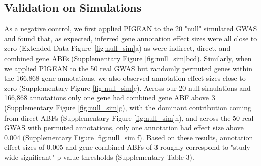 \subsection{Validation on Simulations}
As a negative control, we first applied PIGEAN to the 20 "null" simulated GWAS and found that, as expected, inferred gene annotation effect sizes were all close to zero (Extended Data Figure~\ref{fig:null_sim}a) as were indirect, direct, and combined gene ABFs (Supplementary Figure \ref{fig:null_sim}bcd). Similarly, when we applied PIGEAN to the 50 real GWAS but randomly permuted genes within the 166,868 gene annotations, we also observed annotation effect sizes close to zero (Supplementary  Figure \ref{fig:null_sim}e). Across our 20 null simulations and 166,868 annotations only one gene had combined gene ABF above 3 (Supplementary Figure \ref{fig:null_sim}g), with the dominant contribution coming from direct ABFs (Supplementary Figure \ref{fig:null_sim}h), and across the 50 real GWAS with permuted annotations, only one annotation had effect size above 0.004 (Supplementary Figure \ref{fig:null_sim}f). Based on these results, annotation effect sizes of 0.005 and gene combined ABFs of 3 roughly correspond to "study-wide significant" p-value thresholds (Supplementary Table 3).

